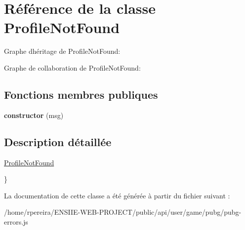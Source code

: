 \hypertarget{classProfileNotFound}{}\section{Référence de la classe Profile\+Not\+Found}
\label{classProfileNotFound}


Graphe d\textquotesingle{}héritage de Profile\+Not\+Found\+:


Graphe de collaboration de Profile\+Not\+Found\+:
\subsection*{Fonctions membres publiques}
\begin{DoxyCompactItemize}
\item 
{\bfseries constructor} (msg)\hypertarget{classProfileNotFound_ab7084684fc414dc2209b32d67e6d4b8f}{}\label{classProfileNotFound_ab7084684fc414dc2209b32d67e6d4b8f}

\end{DoxyCompactItemize}


\subsection{Description détaillée}
\hyperlink{classProfileNotFound}{Profile\+Not\+Found}

\} 

La documentation de cette classe a été générée à partir du fichier suivant \+:\begin{DoxyCompactItemize}
\item 
/home/rpereira/\+E\+N\+S\+I\+I\+E-\/\+W\+E\+B-\/\+P\+R\+O\+J\+E\+C\+T/public/api/user/game/pubg/pubg-\/errors.\+js\end{DoxyCompactItemize}
